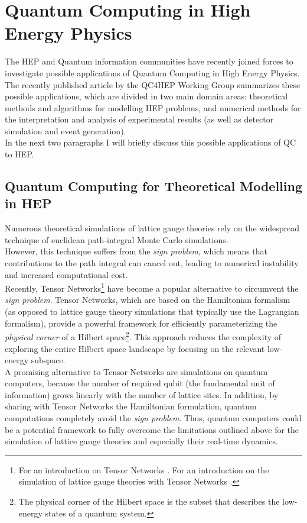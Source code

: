 \section{Quantum Computing in High Energy Physics}

The HEP and Quantum information communities have recently joined forces to investigate possible 
applications of Quantum Computing in High Energy Physics.
The recently published article by the QC4HEP Working Group \cite{dimeglio} summarizes these possible applications, which are divided in 
two main domain areas: theoretical methods and algorithms for modelling HEP problems, and numerical methods 
for the interpretation and analysis of experimental results (as well as detector simulation and event generation).\\
In the next two paragraphs I will briefly discuss this possible applications of QC to HEP.

\subsection{Quantum Computing for Theoretical Modelling in HEP}

Numerous theoretical simulations of lattice gauge theories rely on the widespread technique of euclidean 
path-integral Monte Carlo simulations.\\
However, this technique suffers from the \textit{sign problem}, which means that contributions 
to the path integral can cancel out, leading to numerical instability and increased computational cost.\\
Recently, Tensor Networks\footnote[1]{For an introduction on Tensor Networks \cite{Bridgeman_2017}.
For an introduction on the simulation of lattice gauge theories with Tensor Networks \cite{Dalmonte_2016}.} 
have become a popular alternative to circumvent the 
\textit{sign problem}.
Tensor Networks, which are based on the Hamiltonian formalism (as opposed to lattice gauge theory simulations 
that typically use the Lagrangian formalism), provide a powerful framework for efficiently parameterizing 
the \textit{physical corner} of a Hilbert space\footnote[2]{The physical corner of the Hilbert space is the 
subset that describes the low-energy states of a quantum system.}. 
This approach reduces the complexity of exploring the entire Hilbert space landscape by focusing on the 
relevant low-energy subspace.\\
A promising alternative to Tensor Networks are simulations on quantum computers, because the number of 
required qubit (the fundamental unit of information) grows linearly with the number of lattice sites.
In addition, by sharing with Tensor Networks the Hamiltonian formulation, quantum computations 
completely avoid the \textit{sign problem}.
Thus, quantum computers could be a potential framework to fully overcome the limitations 
outlined above for the simulation of lattice gauge theories and especially their real-time dynamics.



